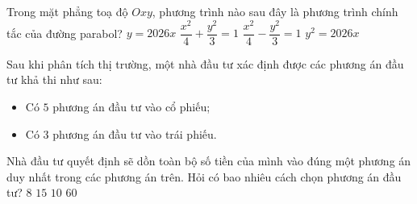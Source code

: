 \begin{ex}%
    Trong mặt phẳng toạ độ $Oxy$, phương trình nào sau đây là phương trình chính tắc của đường parabol?
    \choice
    {$y = 2026x$}
    {$\dfrac{x^2}{4} + \dfrac{y^2}{3} = 1$}
    {$\dfrac{x^2}{4} - \dfrac{y^2}{3} = 1$}
    {\True $y^2 = 2026x$}
\end{ex}

\begin{ex}%
Sau khi phân tích thị trường, một nhà đầu tư xác định được các phương án đầu tư khả thi như sau:
\begin{itemize}
    \item Có $5$ phương án đầu tư vào cổ phiếu;
    \item Có $3$ phương án đầu tư vào trái phiếu.
\end{itemize}

Nhà đầu tư quyết định sẽ dồn toàn bộ số tiền của mình vào đúng một phương án duy nhất trong các phương án trên. Hỏi có bao nhiêu cách chọn phương án đầu tư?
\choice
{\True $8$}
{$15$}
{$10$}
{$60$}
\end{ex}


